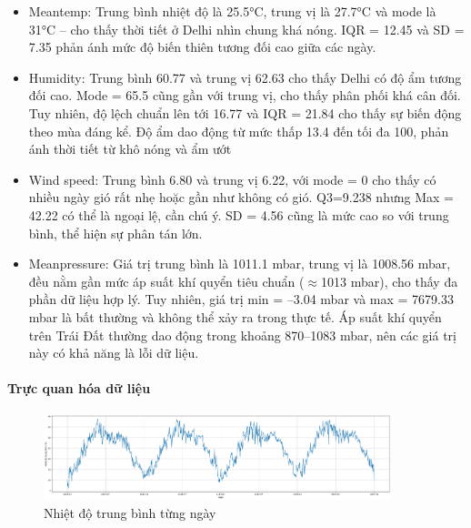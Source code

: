     \begin{itemize}
    \item Meantemp: Trung bình nhiệt độ là 25.5°C, trung vị là 27.7°C và mode là 31°C – cho thấy thời tiết ở Delhi nhìn chung khá nóng. IQR = 12.45 và SD = 7.35 phản ánh mức độ biến thiên tương đối cao giữa các ngày.
    
    \item Humidity: Trung bình 60.77 và trung vị 62.63 cho thấy Delhi có độ ẩm tương đối cao. Mode = 65.5 cũng gần với trung vị, cho thấy phân phối khá cân đối. Tuy nhiên, độ lệch chuẩn lên tới 16.77 và IQR = 21.84 cho thấy sự biến động theo mùa đáng kể. Độ ẩm dao động từ mức thấp 13.4 đến tối đa 100, phản ánh thời tiết từ khô nóng và ẩm ướt
    
    \item Wind speed: Trung bình 6.80 và trung vị 6.22, với mode = 0 cho thấy có nhiều ngày gió rất nhẹ hoặc gần như không có gió. Q3=9.238 nhưng Max = 42.22 có thể là ngoại lệ, cần chú ý. SD = 4.56 cũng là mức cao so với trung bình, thể hiện sự phân tán lớn.

    
    \item Meanpressure: Giá trị trung bình là 1011.1 mbar, trung vị là 1008.56 mbar, đều nằm gần mức áp suất khí quyển tiêu chuẩn ($\approx$1013 mbar), cho thấy đa phần dữ liệu hợp lý. Tuy nhiên, giá trị min = –3.04 mbar và max = 7679.33 mbar là bất thường và không thể xảy ra trong thực tế. Áp suất khí quyển trên Trái Đất thường dao động trong khoảng 870–1083 mbar, nên các giá trị này có khả năng là lỗi dữ liệu. 
    
    \end{itemize}


    \paragraph{Trực quan hóa dữ liệu}
    \leavevmode

    \begin{figure}[htp]
        \centering
        \includegraphics[width=0.90\textwidth]{images/TS_weather_meantemp.png}
        \caption{Nhiệt độ trung bình từng ngày}
        \label{fig:TS_weather_meantemp}
    \end{figure}
    \FloatBarrier

